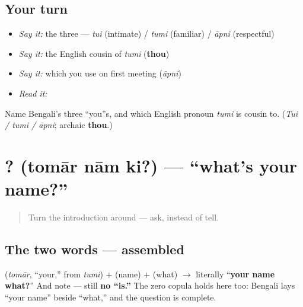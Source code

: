 \subsection*{Your turn}
\begin{itemize}
\raggedright
  \item \emph{Say it:} the three — \emph{tui} (intimate) / \emph{tumi} (familiar) / \emph{āpni} (respectful)
  \item \emph{Say it:} the English cousin of \emph{tumi} (\textbf{thou})
  \item \emph{Say it:} which you use on first meeting (\emph{āpni})
  \item \emph{Read it:} \textbf{}
\end{itemize}

\begin{tcolorbox}[breakable,colback=teal!4,colframe=teal!35!black,title={Before you move on}]
Name Bengali's three \textquotedblleft{}you\textquotedblright{}s, and which English pronoun \emph{tumi} is cousin to. (\emph{Tui / tumi / āpni}; archaic \textbf{thou}.)
\end{tcolorbox}
\section[\texorpdfstring{\bn{তোমার} \bn{নাম} \bn{কি}? (tomār nām ki?)}{তোমার নাম কি? (tomār nām ki?)}]{  ? (tomār nām ki?) — \textquotedblleft{}what's your name?\textquotedblright{}}

\label{lesson:BN-C02-tomar-naam-ki}



\begin{quote}
Turn the introduction around — ask, instead of tell.
\end{quote}

\subsection*{The two words — assembled}
\textbf{} (\emph{tomār}, \textquotedblleft{}your,\textquotedblright{} from \emph{tumi}) + \textbf{} (name) + \textbf{} (what) $\to$ literally \textquotedblleft{}\textbf{your name what?}\textquotedblright{} And note — still \textbf{no \textquotedblleft{}is.\textquotedblright{}} The zero copula holds here too: Bengali lays \textquotedblleft{}your name\textquotedblright{} beside \textquotedblleft{}what,\textquotedblright{} and the question is complete.


